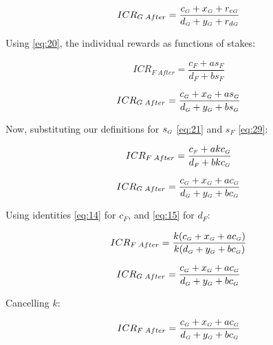 \documentclass[reqno]{article}
\begin{document}
\begin{equation} 
    ICR_{G \; After}=\frac{c_\mathsmaller{G}+x_\mathsmaller{G}+r_{c\mathsmaller{G}}}{d_\mathsmaller{G}+y_\mathsmaller{G}+r_{d\mathsmaller{G}}}
\end{equation}

\bigskip
Using \ref{eq:20}, the individual rewards as functions of stakes:

\begin{equation} 
    ICR_{F \; After}=\frac{c_F+as_F}{d_F+bs_F}
\end{equation}

\begin{equation} 
    ICR_{G \; After}=\frac{c_\mathsmaller{G}+x_\mathsmaller{G}+as_\mathsmaller{G}}{d_\mathsmaller{G}+y_\mathsmaller{G}+bs_\mathsmaller{G}}
\end{equation}

\bigskip
Now, substituting our definitions for $s_\mathsmaller{G}$ \ref{eq:21} and $s_F$ \ref{eq:29}:

\begin{equation} 
    ICR_{F \; After}=\frac{c_\mathsmaller{F}+akc_\mathsmaller{G}}{d_\mathsmaller{F}+bkc_\mathsmaller{G}}
\end{equation}

\begin{equation} 
    ICR_{G \; After}=\frac{c_\mathsmaller{G}+x_\mathsmaller{G}+ac_\mathsmaller{G}}{d_\mathsmaller{G}+y_\mathsmaller{G}+bc_\mathsmaller{G}}
\end{equation}

\bigskip
Using identities \ref{eq:14} for $c_F$, and \ref{eq:15} for $d_F$:

\begin{equation} 
    ICR_{F \; After}=\frac{k(c_\mathsmaller{G} + x_\mathsmaller{G}+ac_\mathsmaller{G})}{k(d_\mathsmaller{G}+y_\mathsmaller{G}+bc_\mathsmaller{G})}
\end{equation}

\begin{equation} 
    ICR_{G \; After}=\frac{c_\mathsmaller{G}+x_\mathsmaller{G}+ac_\mathsmaller{G}}{d_\mathsmaller{G}+y_\mathsmaller{G}+bc_\mathsmaller{G}}
\end{equation}

\bigskip
Cancelling $k$:

\begin{equation} 
        ICR_{F \; After}=\frac{c_\mathsmaller{G} + x_\mathsmaller{G}+ac_\mathsmaller{G}}{d_\mathsmaller{G}+y_\mathsmaller{G}+bc_\mathsmaller{G}}
\end{equation}
\end{document}
